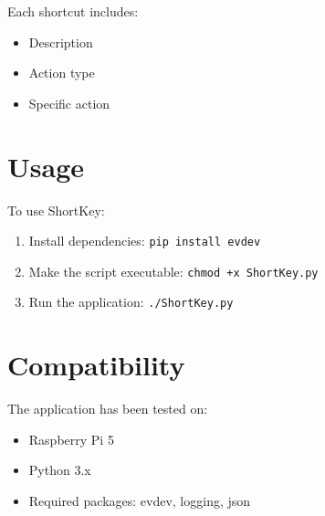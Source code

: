 \documentclass{article}
\begin{document}
Each shortcut includes:
\begin{itemize}
    \item Description
    \item Action type
    \item Specific action
\end{itemize}

\section{Usage}
To use ShortKey:
\begin{enumerate}
    \item Install dependencies: \texttt{pip install evdev}
    \item Make the script executable: \texttt{chmod +x ShortKey.py}
    \item Run the application: \texttt{./ShortKey.py}
\end{enumerate}

\section{Compatibility}
The application has been tested on:
\begin{itemize}
    \item Raspberry Pi 5
    \item Python 3.x
    \item Required packages: evdev, logging, json
\end{itemize}
\end{document}
